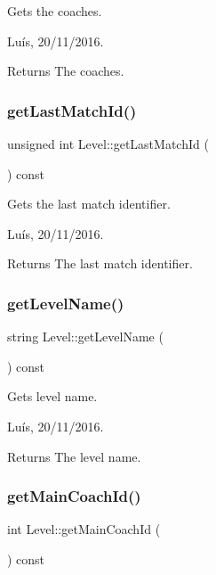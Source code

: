 Gets the coaches. 

Luís, 20/11/2016. 

\begin{DoxyReturn}{Returns}
The coaches. 
\end{DoxyReturn}
\hypertarget{class_level_abe3f06938f9d39800648c0fc0ddbadeb}{}\label{class_level_abe3f06938f9d39800648c0fc0ddbadeb} 
\subsubsection{\texorpdfstring{get\+Last\+Match\+Id()}{getLastMatchId()}}
{\footnotesize\ttfamily unsigned int Level\+::get\+Last\+Match\+Id (\begin{DoxyParamCaption}{ }\end{DoxyParamCaption}) const}



Gets the last match identifier. 

Luís, 20/11/2016. 

\begin{DoxyReturn}{Returns}
The last match identifier. 
\end{DoxyReturn}
\hypertarget{class_level_a810328bff045bfb02159d388414718d8}{}\label{class_level_a810328bff045bfb02159d388414718d8} 
\subsubsection{\texorpdfstring{get\+Level\+Name()}{getLevelName()}}
{\footnotesize\ttfamily string Level\+::get\+Level\+Name (\begin{DoxyParamCaption}{ }\end{DoxyParamCaption}) const}



Gets level name. 

Luís, 20/11/2016. 

\begin{DoxyReturn}{Returns}
The level name. 
\end{DoxyReturn}
\hypertarget{class_level_afda6ab0cbba0cea709e2fb04cdc0187a}{}\label{class_level_afda6ab0cbba0cea709e2fb04cdc0187a} 
\subsubsection{\texorpdfstring{get\+Main\+Coach\+Id()}{getMainCoachId()}}
{\footnotesize\ttfamily int Level\+::get\+Main\+Coach\+Id (\begin{DoxyParamCaption}{ }\end{DoxyParamCaption}) const}



